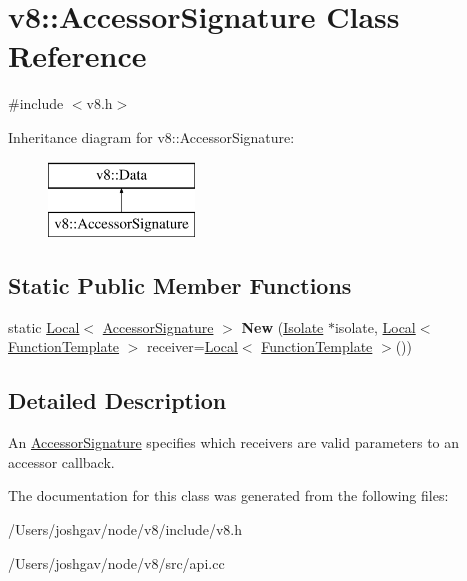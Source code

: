 \hypertarget{classv8_1_1_accessor_signature}{}\section{v8\+:\+:Accessor\+Signature Class Reference}
\label{classv8_1_1_accessor_signature}


{\ttfamily \#include $<$v8.\+h$>$}

Inheritance diagram for v8\+:\+:Accessor\+Signature\+:\begin{figure}[H]
\begin{center}
\leavevmode
\includegraphics[height=2.000000cm]{classv8_1_1_accessor_signature}
\end{center}
\end{figure}
\subsection*{Static Public Member Functions}
\begin{DoxyCompactItemize}
\item 
static \hyperlink{classv8_1_1_local}{Local}$<$ \hyperlink{classv8_1_1_accessor_signature}{Accessor\+Signature} $>$ {\bfseries New} (\hyperlink{classv8_1_1_isolate}{Isolate} $\ast$isolate, \hyperlink{classv8_1_1_local}{Local}$<$ \hyperlink{classv8_1_1_function_template}{Function\+Template} $>$ receiver=\hyperlink{classv8_1_1_local}{Local}$<$ \hyperlink{classv8_1_1_function_template}{Function\+Template} $>$())\hypertarget{classv8_1_1_accessor_signature_a0a35126433259c49bab4d3ac6756dd67}{}\label{classv8_1_1_accessor_signature_a0a35126433259c49bab4d3ac6756dd67}

\end{DoxyCompactItemize}


\subsection{Detailed Description}
An \hyperlink{classv8_1_1_accessor_signature}{Accessor\+Signature} specifies which receivers are valid parameters to an accessor callback. 

The documentation for this class was generated from the following files\+:\begin{DoxyCompactItemize}
\item 
/\+Users/joshgav/node/v8/include/v8.\+h\item 
/\+Users/joshgav/node/v8/src/api.\+cc\end{DoxyCompactItemize}
